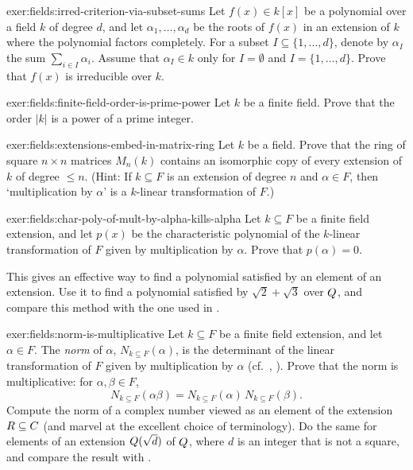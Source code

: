 \begin{exer}{}{exer:fields:irred-criterion-via-subset-sums}
  Let $f(x) \in k[x]$ be a polynomial over a field $k$ of degree $d$,
  and let $\alpha_1, \dots, \alpha_d$ be the roots of $f(x)$ in an
  extension of $k$ where the polynomial factors completely. For a
  subset $I \subseteq \{1, \dots, d\}$, denote by $\alpha_I$ the sum
  $\sum_{i \in I} \alpha_i$.  Assume that $\alpha_I \in k$ only for
  $I = \emptyset$ and $I = \{1, \dots, d\}$. Prove that $f(x)$ is
  irreducible over $k$.
\end{exer}

\begin{exer}{}{exer:fields:finite-field-order-is-prime-power}
  Let $k$ be a finite field. Prove that the order $|k|$ is a power of
  a prime integer.
\end{exer}

\begin{exer}{}{exer:fields:extensions-embed-in-matrix-ring}
  Let $k$ be a field. Prove that the ring of square $n \times n$
  matrices $M_n(k)$ contains an isomorphic copy of every extension of
  $k$ of degree $\leq n$. (Hint: If $k \subseteq F$ is an extension of
  degree $n$ and $\alpha \in F$, then `multiplication by $\alpha$' is
  a $k$-linear transformation of $F$.)
\end{exer}
\begin{exer}{}{exer:fields:char-poly-of-mult-by-alpha-kills-alpha}
  Let $k \subseteq F$ be a finite field extension, and let $p(x)$ be
  the characteristic polynomial of the $k$-linear transformation of
  $F$ given by multiplication by $\alpha$. Prove that $p(\alpha) = 0$.

  This gives an effective way to find a polynomial satisfied by an
  element of an extension. Use it to find a polynomial satisfied by
  $\sqrt{2} + \sqrt{3}$ over $Q$, and compare this method with the
  one used in .
\end{exer}

\begin{exer}{}{exer:fields:norm-is-multiplicative}
  Let $k \subseteq F$ be a finite field extension, and let
  $\alpha \in F$.  The \emph{norm} of $\alpha$,
  $N_{k \subseteq F}(\alpha)$, is the determinant of the linear
  transformation of $F$ given by multiplication by $\alpha$ (cf.\
  ,
  ). Prove that the norm is multiplicative: for
  $\alpha, \beta \in F$,
  \[
    N_{k \subseteq F}(\alpha\beta) = N_{k \subseteq F}(\alpha)\, N_{k
      \subseteq F}(\beta).
  \]
  Compute the norm of a complex number viewed as an element of the
  extension $R \subseteq C$ (and marvel at the excellent choice of
  terminology). Do the same for elements of an extension
  $Q(\sqrt{d})$ of $Q$, where $d$ is an integer that is not a
  square, and compare the result with
  .
\end{exer}

